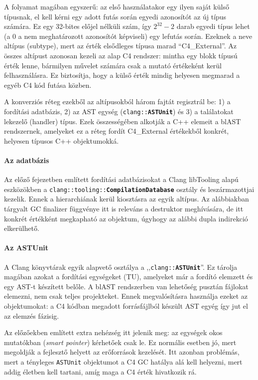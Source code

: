 A folyamat magában egyszerű: az első használatakor egy ilyen saját külső típusnak, el kell kérni egy adott futás során egyedi azonosítót az új típus számára.
Ez egy 32-bites előjel nélküli szám, így $2^{32}-2$ darab egyedi típus lehet (a $0$ a nem meghatározott azonosítót képviseli) egy lefutás során.
Ezeknek a neve altípus (subtype), mert az érték elsődleges típusa marad ``C4\_External''.
Az összes altípust azonosan kezeli az alap C4 rendszer: mintha egy blokk típusú érték lenne, bármilyen művelet számára csak a mutató értékeként kerül felhasználásra.
Ez biztosítja, hogy a külső érték mindig helyesen megmarad a egyéb C4 kód futása közben.

A konverziós réteg ezekből az altípusokból három fajtát regisztrál be: 1) a fordítási adatbázis, 2) az \gls{AST} egység ({\tt clang::\bf ASTUnit}) és 3) a találatokat lekezelő (handler) típus.
Ezek összességében alkotják a C++ elemeit a blAST rendszernek, amelyeket ez a réteg fordít C4\_External értékekből konkrét, helyesen típusos C++ objektumokká.

\paragraph{Az adatbázis}
Az előző fejezetben említett fordítási adatbázisokat a Clang libTooling alapú eszközökben a {\tt clang::tooling::{\bf CompilationDatabase}} osztály és leszármazottjai kezelik.
Ennek a hierarchiának kerül kiosztásra az egyik altípus.
Az alábbiakban tárgyalt \gls{GC} finalizer függvénye itt is releváns a destruktor meghívására, de itt konkrét értékként megkapható az objektum, úgyhogy az alábbi dupla indirekció elkerülhető.

\paragraph{Az ASTUnit}
A Clang könyvtárak egyik alapvető osztálya a {,,{\tt clang::\bf ASTUnit}''}.
Ez tárolja magában azokat a fordítási egységeket (\gls{TU}), amelyeket már a fordító elemzett és egy \gls{AST}-t készített belőle.
A blAST rendszerben van lehetőség pusztán fájlokat elemezni, nem csak teljes projekteket.
Ennek megvalósításra használja ezeket az objektumokat: a C4 kódban megadott forrásfájlból készült \gls{AST} egyég így jut el az elemzés fázisig.

Az előzőekben említett extra nehézség itt jelenik meg: az egységek okos mutatókban ({\it smart pointer}) kérhetőek csak le.
Ez normális esetben jó, mert megoldják a fejlesztő helyett az erőforrások kezelését.
Itt azonban problémás, mert a tényleges {\tt ASTUnit} objektumot a C4 \gls{GC} hatálya alá kell helyezni, mert addig életben kell tartani, amíg maga a C4 érték hivatkozik rá.

